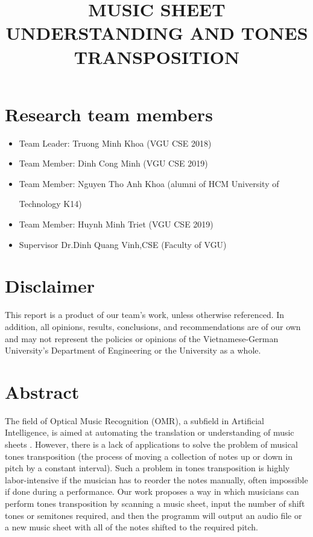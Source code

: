 \documentclass[a4paper,12pt]{report}
\title{ MUSIC SHEET UNDERSTANDING AND TONES TRANSPOSITION}
\author{}
\begin{document}
\afterpage{\null\newpage}

\maketitle

\tableofcontents

\clearpage

\section{Research team members}
\begin{itemize}
	\item Team Leader:      \hfill Truong Minh Khoa  (VGU CSE 2018)
	\item Team Member: 		\hfill Dinh Cong Minh (VGU CSE 2019)
	\item Team Member:	    \hfill Nguyen Tho Anh Khoa (alumni of HCM University of 

                            \hfill Technology K14)
	\item Team Member:	    \hfill Huynh Minh Triet (VGU CSE 2019)
    \item Supervisor        \hfill Dr.Dinh Quang Vinh,CSE (Faculty of VGU) 
\end{itemize}


\section{Disclaimer} 
This report is a product of our team's work, unless otherwise referenced. In
addition, all opinions, results, conclusions, and recommendations are of our own
and may not represent the policies or opinions of the Vietnamese-German
University's Department of Engineering or the University as a whole. 

\clearpage

\section{Abstract} 

The field of Optical Music Recognition (OMR), a subfield in Artificial
Intelligence, is aimed at automating the translation or understanding of music
sheets \cite{Calvo-Zaragoza}.  However, there is a lack of applications to solve
the problem of musical tones transposition (the process of moving a collection
of notes up or down in pitch by a constant interval).  Such a problem in tones
transposition is highly labor-intensive if the musician has to reorder the notes
manually, often impossible if done during a performance. Our work proposes a way
in which musicians can perform tones transposition by scanning a music sheet,
input the number of shift tones or semitones required, and then the programm
will output an audio file or a new music sheet with all of the notes shifted to
the required pitch. 
\end{document}
